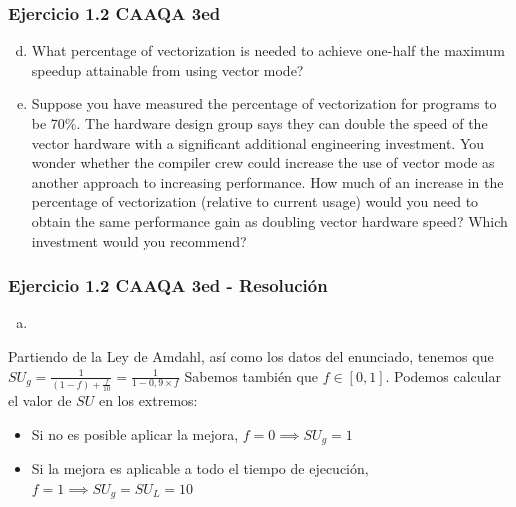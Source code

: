 \documentclass{beamer}
\begin{document}
\begin{frame}
\frametitle{Ejercicio 1.2 CAAQA 3ed}
\begin{enumerate}[a.]\setcounter{enumi}{3}
\item What percentage of vectorization is needed to achieve one-half the maximum speedup attainable from using vector mode?
\item Suppose you have measured the percentage of vectorization for programs to be 70\%. The hardware design group says they can double the speed of the vector hardware with a significant additional engineering investment. You wonder whether the compiler crew could increase the use of vector mode as another approach to increasing performance. How much of an increase in the percentage of vectorization (relative to current usage) would you need to obtain the same performance gain as doubling vector hardware speed? Which investment would you recommend?
\end{enumerate}
\end{frame}

\begin{frame}
\frametitle{Ejercicio 1.2 CAAQA 3ed - Resolución}
\begin{enumerate}[a.]
\item
\end{enumerate}
Partiendo de la Ley de Amdahl, así como los datos del enunciado, tenemos que $ SU_g = \frac{1}{(1-f) + \frac{f}{10}} = \frac{1}{1 - 0,9 \times f}$
 Sabemos también que $ f \in [0, 1] $. Podemos calcular el valor de $SU$ en los extremos:
 
\bigskip
 \begin{itemize}
 \item Si no es posible aplicar la mejora, $f = 0 \implies SU_g = 1$
 \item Si la mejora es aplicable a todo el tiempo de ejecución, $ f = 1 \implies SU_g = SU_L = 10 $
 \end{itemize}
\end{frame}
\end{document}
